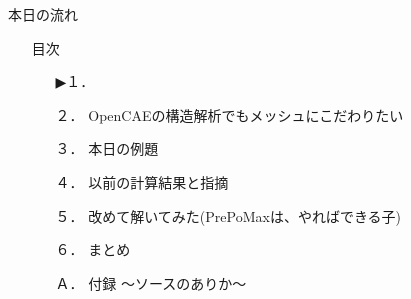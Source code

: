 \begin{frame}{本日の流れ}
  \begin{itemize}
      \item[] 目次
    \begin{enumerate}[label=\textbf{ \arabic*.},itemsep=1.3ex, leftmargin=1cm]
        \item[▶１．] 
        \item[２．] OpenCAEの構造解析でもメッシュにこだわりたい
        \item[３．] 本日の例題
        \item[４．] 以前の計算結果と指摘
        \item[５．] 改めて解いてみた(PrePoMaxは、やればできる子)
        \item[６．] まとめ
        \item[Ａ．] 付録 ～ソースのありか～
    \end{enumerate}
  \end{itemize}
\end{frame}
